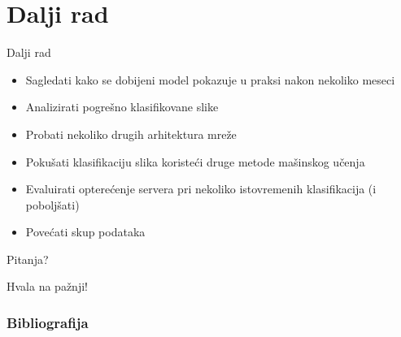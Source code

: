 \documentclass{beamer}
\begin{document}
\section{Dalji rad}
\begin{frame}{Dalji rad}
    \begin{itemize}
        \item Sagledati kako se dobijeni model pokazuje u praksi nakon nekoliko meseci
        \item Analizirati pogrešno klasifikovane slike
        \item Probati nekoliko drugih arhitektura mreže
        \item Pokušati klasifikaciju slika koristeći druge metode mašinskog učenja
        \item Evaluirati opterećenje servera pri nekoliko istovremenih klasifikacija (i poboljšati)
        \item Povećati skup podataka
    \end{itemize}
\end{frame}



\begin{frame}
\Huge{\centerline{Pitanja?}}
\end{frame}
\begin{frame}
\Huge{\centerline{Hvala na pažnji!}}
\end{frame}

\begin{frame}[t, allowframebreaks]
\frametitle{Bibliografija}


\end{frame}


\end{document}
